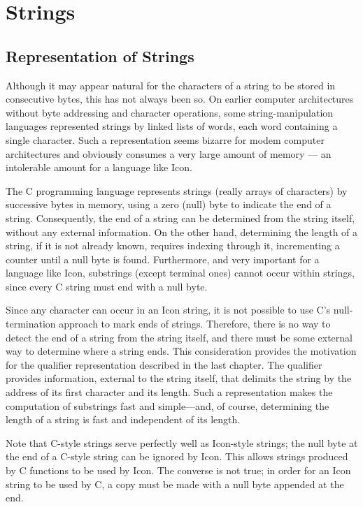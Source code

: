 \section{Strings}
\subsection{Representation of Strings}

Although it may appear natural for the characters of a string to be
stored in consecutive bytes, this has not always been so. On earlier
computer architectures without byte addressing and character
operations, some string-manipulation languages represented strings by
linked lists of words, each word containing a single character. Such a
representation seems bizarre for modem computer architectures and
obviously consumes a very large amount of memory --- an intolerable amount
for a language like Icon.

The C programming language represents strings (really arrays of
characters) by successive bytes in memory, using a zero (null) byte to
indicate the end of a string. Consequently, the end of a string can be
determined from the string itself, without any external
information. On the other hand, determining the length of a string, if
it is not already known, requires indexing through it, incrementing a
counter until a null byte is found. Furthermore, and very important
for a language like Icon, substrings (except terminal ones) cannot
occur within strings, since every C string must end with a null byte.

Since any character can occur in an Icon string, it is not possible to
use C's null-termination approach to mark ends of strings. Therefore,
there is no way to detect the end of a string from the string itself,
and there must be some external way to determine where a string
ends. This consideration provides the motivation for the qualifier
representation described in the last chapter. The qualifier provides
information, external to the string itself, that delimits the string
by the address of its first character and its length. Such a
representation makes the computation of substrings fast and
simple---and, of course, determining the length of a string is
fast and independent of its length.

Note that C-style strings serve perfectly well as Icon-style strings;
the null byte at the end of a C-style string can be ignored by
Icon. This allows strings produced by C functions to be used by
Icon. The converse is not true; in order for an Icon string to be used
by C, a copy must be made with a null byte appended at the end.

